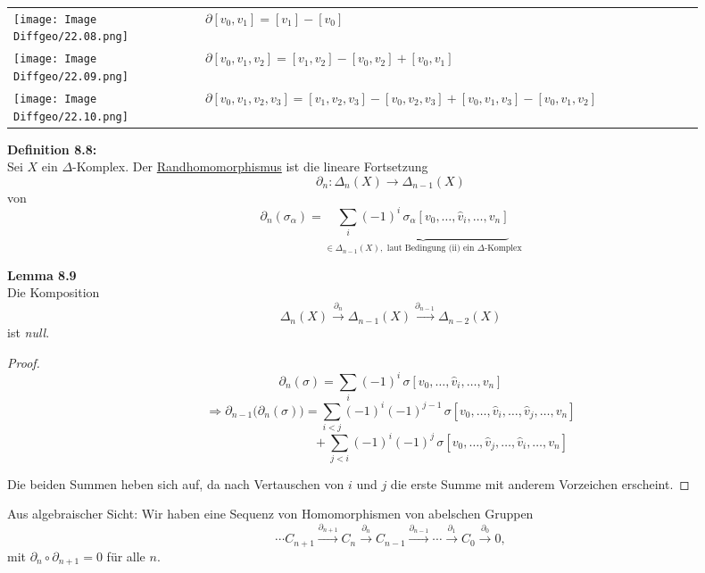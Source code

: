 \documentclass[fleqn, 12pt, letterpaper]{article}
\begin{document}
\begin{center}
\setlength{\extrarowheight}{5.0ex}
\begin{tabular}{>{\centering\arraybackslash}m{0.25\linewidth} >{\raggedright\arraybackslash}m{0.65\linewidth}}
  \texttt{[image: Image Diffgeo/22.08.png]} & 
  \(\partial [v_0, v_1] = [v_1] - [v_0]\) \\
  
  \texttt{[image: Image Diffgeo/22.09.png]} & 
  \(\partial [v_0, v_1, v_2] = [v_1, v_2] - [v_0, v_2] + [v_0, v_1]\) \\
  
  \texttt{[image: Image Diffgeo/22.10.png]} & 
  \(\partial [v_0, v_1, v_2, v_3] = [v_1, v_2, v_3] - [v_0, v_2, v_3] + [v_0, v_1, v_3] - [v_0, v_1, v_2]\) \\
\end{tabular}
\end{center}


\textbf{Definition 8.8:} \\
Sei $X$ ein $\Delta$-Komplex. Der \underline{Randhomomorphismus} ist die lineare Fortsetzung
\[
\partial_n : \Delta_n(X) \to \Delta_{n-1}(X)
\]
von
\[
\partial_n(\sigma_\alpha) = \underbrace{\sum_i (-1)^i \, \sigma_\alpha [v_0, \dots, \hat{v}_i, \dots, v_n]}_{\in \Delta_{n-1}(X), \text{ laut Bedingung (ii) ein $\Delta$-Komplex}}
\]

\textbf{Lemma 8.9} \\
Die Komposition
\[
\Delta_n(X) \xrightarrow{\partial_n} \Delta_{n-1}(X) \xrightarrow{\partial_{n-1}} \Delta_{n-2}(X)
\]
ist \emph{null}.

\begin{proof}
\[
\partial_n(\sigma) = \sum_i (-1)^i \, \sigma [v_0, \dots, \hat{v}_i, \dots, v_n]
\]
\[
\Rightarrow  \partial_{n-1} \big(\partial_n(\sigma)\big)
= \sum_{i < j} (-1)^i (-1)^{j-1} \, \sigma [v_0, \dots, \hat{v}_i, \dots, \hat{v}_j, \dots, v_n] \]
\[\qquad \qquad\qquad\qquad+ \sum_{j < i} (-1)^i (-1)^j \, \sigma [v_0, \dots, \hat{v}_j, \dots, \hat{v}_i, \dots, v_n]
\]

Die beiden Summen heben sich auf, da nach Vertauschen von $i$ und $j$ die erste Summe mit anderem Vorzeichen erscheint.    
\end{proof}


Aus algebraischer Sicht: Wir haben eine Sequenz von Homomorphismen von abelschen Gruppen
\[
\cdots C_{n+1}\xrightarrow{\partial_{n+1}} C_n \xrightarrow{\partial_n} C_{n-1} \xrightarrow{\partial_{n-1}} \cdots \xrightarrow{\partial_1} C_0 \xrightarrow{\partial_0} 0,
\]
mit $\partial_n \circ \partial_{n+1} = 0$ für alle $n$.\\
\end{document}
